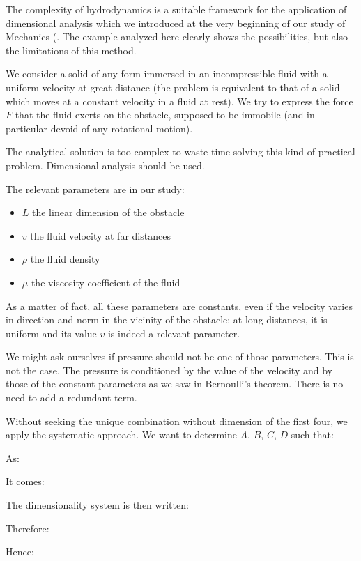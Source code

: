	The complexity of hydrodynamics is a suitable framework for the application of dimensional analysis which we introduced at the very beginning of our study of Mechanics (. The example analyzed here clearly shows the possibilities, but also the limitations of this method.

	We consider a solid of any form immersed in an incompressible fluid with a uniform velocity at great distance (the problem is equivalent to that of a solid which moves at a constant velocity in a fluid at rest). We try to express the force $F$ that the fluid exerts on the obstacle, supposed to be immobile (and in particular devoid of any rotational motion).

	The analytical solution is too complex to waste time solving this kind of practical problem. Dimensional analysis should be used.

	The relevant parameters are in our study:
	\begin{itemize}
		\item $L$ the linear dimension of the obstacle

		\item $v$ the fluid velocity at far distances

		\item $\rho$ the fluid density

		\item $\mu$ the viscosity coefficient of the fluid
	\end{itemize}
	As a matter of fact, all these parameters are constants, even if the velocity varies in direction and norm in the vicinity of the obstacle: at long distances, it is uniform and its value $v$ is indeed a relevant parameter.

	We might ask ourselves if pressure should not be one of those parameters. This is not the case. The pressure is conditioned by the value of the velocity and by those of the constant parameters as we saw in Bernoulli's theorem. There is no need to add a redundant term.

	Without seeking the unique combination without dimension of the first four, we apply the systematic approach. We want to determine $A$, $B$, $C$, $D$ such that:
	
	As:
	
	It comes:
	
	The dimensionality system is then written:
	
	Therefore:
	
	Hence:
	

